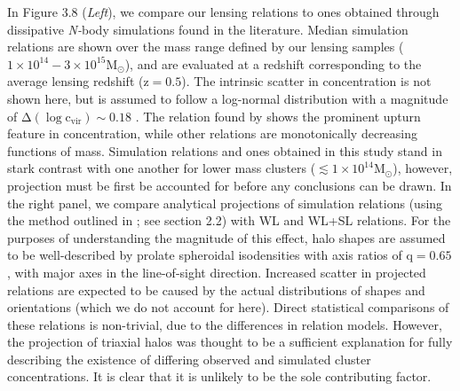 In Figure 3.8 ({\em Left}), we compare our lensing relations to ones obtained through
dissipative {\em N-}body simulations found in the literature. Median simulation
relations are shown over the mass range defined by our lensing samples
($\mathrm{1\times 10^{14} - 3\times 10^{15} M_{\odot}}$), and are
evaluated at a redshift corresponding to the average lensing redshift
($\mathrm{z=0.5}$). The intrinsic scatter in concentration is not shown here,
but is assumed to follow a log-normal distribution with a magnitude of
$\mathrm{\Delta (\log c_{vir}) \sim 0.18}$ \citep{BU01.1}. The relation found by
\citet{PR12.1} shows the prominent upturn feature in concentration, while
other relations are monotonically decreasing functions of mass. Simulation
relations and ones obtained in this study stand in stark contrast with one
another for lower mass clusters ($\mathrm{\lesssim 1\times 10^{14}
  M_{\odot}}$), however, projection must be first be accounted for before any 
conclusions can be drawn. In the right panel, we compare analytical projections of
simulation relations (using the method outlined in \citealt{GR14.1}; see
section 2.2) with WL and WL+SL relations. For the purposes of understanding the
magnitude of this effect, halo shapes are assumed to be well-described by prolate spheroidal
isodensities with axis ratios of $\mathrm{q=0.65}$ \citep{JI02.1}, with major axes in the 
line-of-sight direction. Increased scatter in projected relations are expected
to be caused by the actual distributions of shapes and orientations (which we do not
account for here). Direct statistical comparisons of these relations is
non-trivial, due to the differences in relation models. However, the projection of
triaxial halos was thought to be a sufficient explanation for fully describing
the existence of differing observed and simulated cluster concentrations. It
is clear that it is unlikely to be the sole contributing factor.

